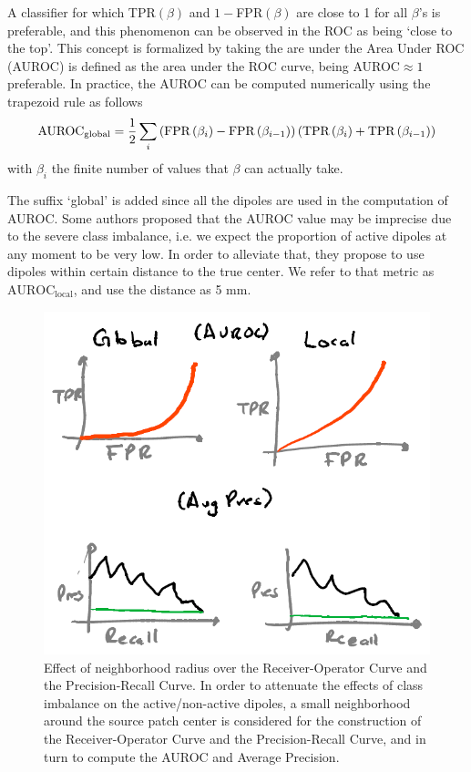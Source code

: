 A classifier for which TPR$(\beta)$ and $1-$FPR$(\beta)$ are close to 1 for all $\beta$'s is preferable, and this phenomenon can be observed in the ROC as being `close to the top'.
%
This concept is formalized by taking the are under the Area Under ROC (AUROC) is defined as the area under the ROC curve, being AUROC$\approx 1$ preferable.
%
In practice, the AUROC can be computed numerically using the trapezoid rule as follows
\begin{equation}
\text{AUROC}_\text{global} =
\frac{1}{2}
\sum_{i}
\left(  \text{FPR}\left( \beta_i \right)-\text{FPR}\left( \beta_{i-1} \right)  \right)
\left(  \text{TPR}\left( \beta_i \right)+\text{TPR}\left( \beta_{i-1} \right)  \right)
\end{equation}
with $\beta_i$ the finite number of values that $\beta$ can actually take.

The suffix `global' is added since all the dipoles are used in the computation of AUROC.
%
Some authors proposed that the AUROC value may be imprecise due to the severe class imbalance, i.e. we expect the proportion of active dipoles at any moment to be very low.
%
In order to alleviate that, they propose to use dipoles within certain distance to the true center.
%
We refer to that metric as $\text{AUROC}_\text{local}$, and use the distance as 5 \si{mm}.

\begin{figure}
\centering
\includegraphics[width=0.8\linewidth]{./img_dev/nsCurves4}
\caption{Effect of neighborhood radius over the Receiver-Operator Curve and the Precision-Recall Curve. In order to attenuate the effects of class imbalance on the active/non-active dipoles, a small neighborhood around the source patch center is considered for the construction of the Receiver-Operator Curve and the Precision-Recall Curve, and in turn to compute the AUROC and Average Precision.}
\end{figure}

